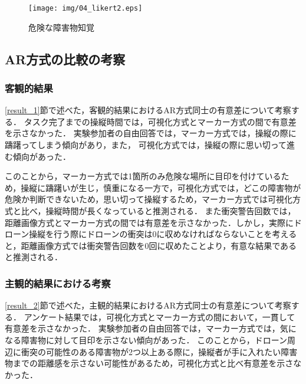 \documentclass[submit]{ipsj}
\begin{document}

\begin{figure}[tb]
\centering
\texttt{[image: img/04\_likert2.eps]}
\caption{危険な障害物知覚}
\label{fig:04_likert2}
\end{figure}
\subsection{AR方式の比較の考察}
\subsubsection{客観的結果}
\ref{result_1}節で述べた，客観的結果におけるAR方式同士の有意差について考察する．
タスク完了までの操縦時間では，可視化方式とマーカー方式の間で有意差を示さなかった．
実験参加者の自由回答では，マーカー方式では，操縦の際に躊躇ってしまう傾向があり，また，
可視化方式では，操縦の際に思い切って進む傾向があった．

このことから，マーカー方式では1箇所のみ危険な場所に目印を付けているため，操縦に躊躇いが生じ，慎重になる一方で，可視化方式では，どこの障害物が危険か判断できないため，思い切って操縦するため，マーカー方式では可視化方式と比べ，操縦時間が長くなっていると推測される．
また衝突警告回数では，距離画像方式とマーカー方式の間では有意差を示さなかった．しかし，実際にドローン操縦を行う際にドローンの衝突は0に収めなければならないことを考えると，距離画像方式では衝突警告回数を0回に収めたことより，有意な結果であると推測される．

\subsubsection{主観的結果における考察}
\ref{result_2}節で述べた，主観的結果におけるAR方式同士の有意差について考察する．
アンケート結果では，可視化方式とマーカー方式の間において，一貫して有意差を示さなかった．
実験参加者の自由回答では，マーカー方式では，気になる障害物に対して目印を示さない傾向があった．
このことから，ドローン周辺に衝突の可能性のある障害物が2つ以上ある際に，操縦者が手に入れたい障害物までの距離感を示さない可能性があるため，可視化方式と比べ有意差を示さなかった．
\end{document}
